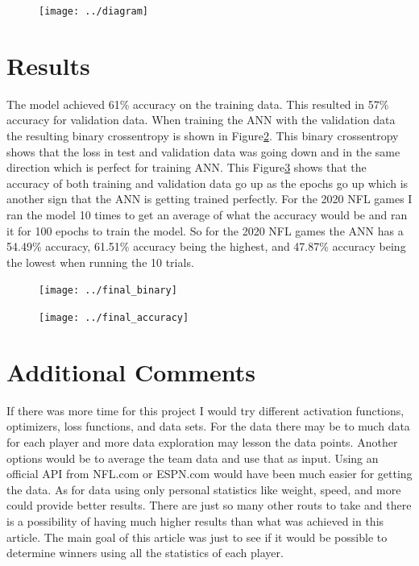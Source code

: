 \documentclass[12pt]{IEEEtran}
\begin{document}
\begin{figure}
	\centering
	\texttt{[image: ../diagram]}
	\caption{}
	\label{fig:diagram}
\end{figure}


\section{Results}
The model achieved 61\% accuracy on the training data. This resulted in 57\% accuracy for validation data. When training the ANN with the validation data the resulting binary crossentropy is shown in Figure\ref{fig:finalbinary}. This binary crossentropy shows that the loss in test and validation data was going down and in the same direction which is perfect for training ANN. This Figure\ref{fig:finalaccuracy} shows that the accuracy of both training and validation data go up as the epochs go up which is another sign that the ANN is getting trained perfectly. For the 2020 NFL games I ran the model 10 times to get an average of what the accuracy would be and ran it for 100 epochs to train the model. So for the 2020 NFL games the ANN has a 54.49\% accuracy, 61.51\% accuracy being the highest, and 47.87\% accuracy being the lowest when running the 10 trials. 

\begin{figure}
	\centering
	\texttt{[image: ../final\_binary]}
	\caption{}
	\label{fig:finalbinary}
\end{figure}

\begin{figure}
	\centering
	\texttt{[image: ../final\_accuracy]}
	\caption{}
	\label{fig:finalaccuracy}
\end{figure}

\section{Additional Comments}
If there was more time for this project I would try different activation functions, optimizers, loss functions, and data sets. For the data there may be to much data for each player and more data exploration may lesson the data points. Another options would be to average the team data and use that as input. Using an official API from NFL.com or ESPN.com would have been much easier for getting the data. As for data using only personal statistics like weight, speed, and more could provide better results. There are just so many other routs to take and there is a possibility of having much higher results than what was achieved in this article. The main goal of this article was just to see if it would be possible to determine winners using all the statistics of each player. 
\end{document}
